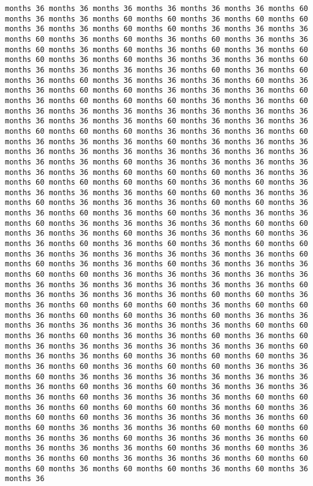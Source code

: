 \documentclass[11pt]{article}
\begin{document}
\begin{Verbatim}[commandchars=\\\{\}, frame=single, framerule=2mm, rulecolor=\color{outerrorbackground}]
months 36 months 36 months 36 months 36 months 36 months 36 months 60 months 36 months 36 months 60 months 60 months 36 months 60 months 60 months 36 months 36 months 60 months 60 months 36 months 36 months 36 months 60 months 36 months 60 months 36 months 60 months 36 months 36 months 60 months 36 months 60 months 36 months 60 months 36 months 60 months 60 months 36 months 60 months 36 months 36 months 36 months 60 months 36 months 36 months 36 months 36 months 60 months 36 months 60 months 36 months 60 months 36 months 36 months 36 months 60 months 36 months 36 months 60 months 60 months 36 months 36 months 36 months 60 months 36 months 60 months 60 months 60 months 36 months 36 months 60 months 36 months 36 months 36 months 36 months 36 months 36 months 36 months 36 months 36 months 36 months 60 months 36 months 36 months 36 months 60 months 60 months 60 months 36 months 36 months 36 months 60 months 36 months 36 months 36 months 60 months 36 months 36 months 36 months 36 months 36 months 36 months 36 months 36 months 36 months 36 months 36 months 36 months 60 months 36 months 36 months 36 months 36 months 36 months 36 months 60 months 60 months 60 months 36 months 36 months 60 months 60 months 60 months 60 months 36 months 60 months 36 months 36 months 36 months 36 months 60 months 60 months 36 months 36 months 60 months 36 months 36 months 36 months 60 months 60 months 36 months 36 months 60 months 36 months 60 months 36 months 36 months 36 months 60 months 36 months 36 months 36 months 36 months 60 months 60 months 36 months 36 months 60 months 36 months 36 months 60 months 36 months 36 months 60 months 36 months 60 months 36 months 60 months 60 months 36 months 36 months 36 months 36 months 36 months 36 months 60 months 60 months 36 months 36 months 60 months 36 months 36 months 36 months 60 months 60 months 36 months 36 months 36 months 36 months 36 months 36 months 36 months 36 months 36 months 36 months 36 months 60 months 36 months 36 months 36 months 36 months 60 months 60 months 36 months 36 months 60 months 60 months 60 months 36 months 60 months 60 months 36 months 60 months 60 months 36 months 60 months 36 months 36 months 36 months 36 months 36 months 36 months 36 months 60 months 60 months 36 months 60 months 36 months 36 months 60 months 36 months 60 months 36 months 36 months 36 months 36 months 36 months 36 months 60 months 36 months 36 months 60 months 36 months 60 months 60 months 36 months 36 months 60 months 36 months 60 months 60 months 36 months 36 months 60 months 36 months 36 months 36 months 36 months 36 months 36 months 36 months 60 months 36 months 60 months 36 months 36 months 36 months 36 months 60 months 36 months 36 months 36 months 60 months 60 months 36 months 60 months 60 months 60 months 36 months 60 months 36 months 60 months 60 months 36 months 36 months 36 months 36 months 60 months 60 months 36 months 36 months 36 months 60 months 60 months 60 months 36 months 36 months 60 months 36 months 36 months 36 months 60 months 36 months 36 months 36 months 60 months 36 months 60 months 36 months 36 months 60 months 36 months 36 months 36 months 60 months 60 months 60 months 36 months 60 months 60 months 36 months 60 months 36 months 36 
\end{Verbatim}
\end{document}
